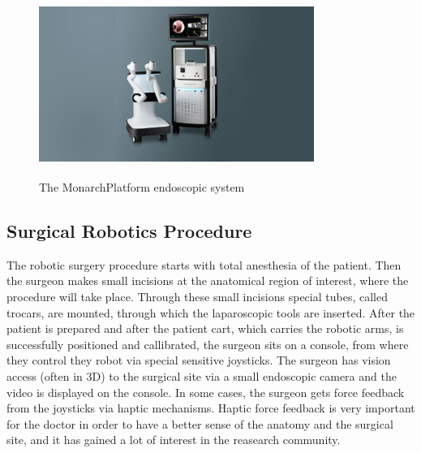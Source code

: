 \begin{center}
\begin{figure}[H]
\centering
\includegraphics[width=0.8\textwidth]{images/Moarch_Platform_1200_x_676_1_.jpg}\\
\caption[The Monarch\textsuperscript \texttrademark Platform endoscopic system]{The Monarch\textsuperscript \texttrademark Platform endoscopic system \footnotemark}
\end{figure}
\end{center}


\subsection{Surgical Robotics Procedure}

The robotic surgery procedure starts with total anesthesia of the patient. Then the surgeon makes small incisions at the anatomical region of interest, where the procedure will take place. Through 
these small incisions special tubes, called trocars, are mounted, through which the laparoscopic tools are inserted. After the patient is prepared and after the patient cart, which carries the robotic arms, 
is successfully positioned and callibrated, the surgeon sits on a console, from where they control they robot via special sensitive joysticks. The surgeon has vision access (often in 3D) to the surgical site via a
small endoscopic camera and the video is displayed on the console. In some cases, the surgeon gets force feedback from the joysticks via haptic mechanisms. Haptic force feedback is very important for the doctor 
in order to have a better sense of the anatomy and the surgical site, and it has gained a lot of interest in the reasearch community.

